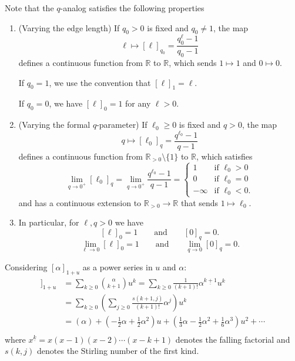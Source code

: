 \documentclass{amsart}
\theoremstyle{definition}
\newcommand{\RR}{\mathbb{R}}
\newcommand{\RRpos}{\RR_{>0}}
\newcommand{\fanalog}[2]{[\![#2]\!]_{#1}}
\begin{document}
Note that the $q$-analog satisfies the following properties
\begin{enumerate}
\item (Varying the edge length) If $q_0>0$ is fixed and $q_0 \neq 1$, the map 
$$\ell \mapsto [\ell]_{q_0} = \frac{q_0^\ell - 1}{q_0 - 1}$$
defines a continuous function from $\RR$ to $\RR$,
which sends $1 \mapsto 1$ and $0 \mapsto 0$.

If $q_0 = 1$,
we use the convention that $[\ell]_1 = \ell$.

If $q_0 = 0$,
we have $[\ell]_0 = 1$ for any $\ell > 0$.

\item (Varying the formal $q$-parameter) If $\ell_0\geq 0$ is fixed and $q > 0$,
the map 
$$q \mapsto [\ell_0]_q = \frac{q^{\ell_0} - 1}{q - 1}$$
defines a continuous function from $\RRpos \setminus\{1\}$ to $\RR$,
which satisfies
$$ \lim_{q \to 0^+} [\ell_0]_q  = 
\lim_{q \to 0^+} \frac{q^{\ell_0} - 1}{q - 1} =
\begin{cases}
 1 &\text{if } \ell_0 > 0 \\
 0 &\text{if } \ell_0 = 0 \\
 -\infty &\text{if } \ell_0 <0.
\end{cases}$$
and has a continuous extension to $\RRpos \to \RR$ that sends $1 \mapsto \ell_0$.

\item 
In particular, for $\ell, q > 0$ we have
$$
[\ell]_0 = 1 
\qquad\text{and}\qquad
[0]_q = 0.
$$
$$
\lim_{\ell \to 0} [\ell]_0 = 1 
\qquad\text{and}\qquad
\lim_{q \to 0} [0]_q = 0.
$$
\end{enumerate}

Considering $[\alpha]_{1+u}$ as a power series in $u$ and $\alpha$:
\begin{align*}
\fanalog{1 + u}{\alpha} &= \sum_{k \geq 0} \binom{\alpha}{k+1}u^k  
= \sum_{k \geq 0} \frac1{(k+1)!} \alpha^{\underline{k+1}} u^k \\
&= \sum_{k \geq 0} \left( \sum_{j \geq 0} \frac{s(k+1,j)}{(k+1)!} \alpha^j \right) u^k \\
&= (\alpha) + (-\frac12\alpha + \frac12 \alpha^2)u + (\frac13\alpha - \frac12 \alpha^2 + \frac16 \alpha^3)u^2 + \cdots \\
\end{align*}
where $x^{\underline{k}} = x(x-1)(x-2)\cdots(x-k+1)$ denotes the falling factorial and $s(k,j)$ denotes the Stirling number of the first kind.
\end{document}
